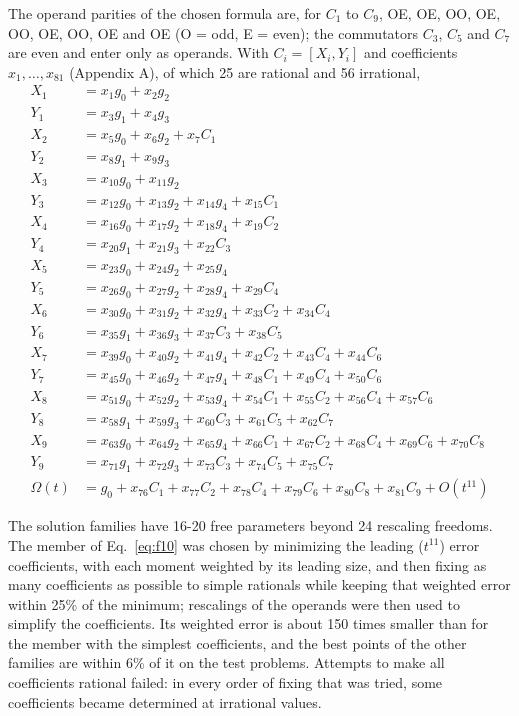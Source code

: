 \documentclass[12pt]{article}
\begin{document}
The operand parities of the chosen formula are, for $C_1$ to $C_9$, OE, OE, OO, OE, OO, OE, OO, OE and OE (O = odd, E = even); the commutators $C_3$, $C_5$ and $C_7$ are even and enter only as operands. With $C_i=[X_i,Y_i]$ and coefficients $x_1,\ldots,x_{81}$ (Appendix A), of which 25 are rational and 56 irrational,
\begin{equation}
\begin{aligned}
X_{1}&=x_{1}g_{0}+x_{2}g_{2}\\
Y_{1}&=x_{3}g_{1}+x_{4}g_{3}\\
X_{2}&=x_{5}g_{0}+x_{6}g_{2}+x_{7}C_{1}\\
Y_{2}&=x_{8}g_{1}+x_{9}g_{3}\\
X_{3}&=x_{10}g_{0}+x_{11}g_{2}\\
Y_{3}&=x_{12}g_{0}+x_{13}g_{2}+x_{14}g_{4}+x_{15}C_{1}\\
X_{4}&=x_{16}g_{0}+x_{17}g_{2}+x_{18}g_{4}+x_{19}C_{2}\\
Y_{4}&=x_{20}g_{1}+x_{21}g_{3}+x_{22}C_{3}\\
X_{5}&=x_{23}g_{0}+x_{24}g_{2}+x_{25}g_{4}\\
Y_{5}&=x_{26}g_{0}+x_{27}g_{2}+x_{28}g_{4}+x_{29}C_{4}\\
X_{6}&=x_{30}g_{0}+x_{31}g_{2}+x_{32}g_{4}+x_{33}C_{2}+x_{34}C_{4}\\
Y_{6}&=x_{35}g_{1}+x_{36}g_{3}+x_{37}C_{3}+x_{38}C_{5}\\
X_{7}&=x_{39}g_{0}+x_{40}g_{2}+x_{41}g_{4}+x_{42}C_{2}+x_{43}C_{4}+x_{44}C_{6}\\
Y_{7}&=x_{45}g_{0}+x_{46}g_{2}+x_{47}g_{4}+x_{48}C_{1}+x_{49}C_{4}+x_{50}C_{6}\\
X_{8}&=x_{51}g_{0}+x_{52}g_{2}+x_{53}g_{4}+x_{54}C_{1}+x_{55}C_{2}+x_{56}C_{4}+x_{57}C_{6}\\
Y_{8}&=x_{58}g_{1}+x_{59}g_{3}+x_{60}C_{3}+x_{61}C_{5}+x_{62}C_{7}\\
X_{9}&=x_{63}g_{0}+x_{64}g_{2}+x_{65}g_{4}+x_{66}C_{1}+x_{67}C_{2}+x_{68}C_{4}+x_{69}C_{6}+x_{70}C_{8}\\
Y_{9}&=x_{71}g_{1}+x_{72}g_{3}+x_{73}C_{3}+x_{74}C_{5}+x_{75}C_{7}\\
\Omega(t)&=g_{0}+x_{76}C_{1}+x_{77}C_{2}+x_{78}C_{4}+x_{79}C_{6}+x_{80}C_{8}+x_{81}C_{9}+O(t^{11})
\end{aligned}\label{eq:f10}
\end{equation}

The solution families have 16-20 free parameters beyond 24 rescaling freedoms. The member of Eq.~\ref{eq:f10} was chosen by minimizing the leading ($t^{11}$) error coefficients, with each moment weighted by its leading size, and then fixing as many coefficients as possible to simple rationals while keeping that weighted error within 25\% of the minimum; rescalings of the operands were then used to simplify the coefficients. Its weighted error is about 150 times smaller than for the member with the simplest coefficients, and the best points of the other families are within 6\% of it on the test problems. Attempts to make all coefficients rational failed: in every order of fixing that was tried, some coefficients became determined at irrational values.
\end{document}
